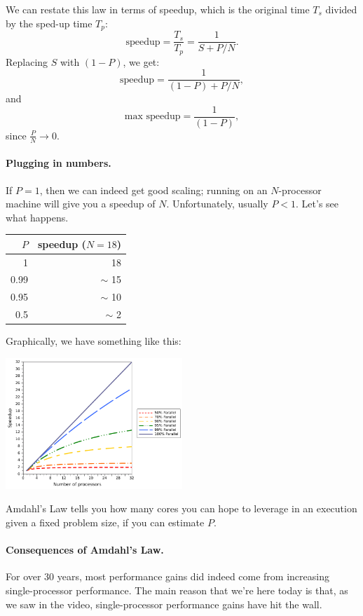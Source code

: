 \documentclass[11pt]{article}
\begin{document}
We can restate this law in terms of speedup, which is the 
original time $T_s$ divided by the sped-up time $T_p$:
\[ \mbox{speedup} = \frac{T_s}{T_p} = \frac{1}{S+P/N}. \]
Replacing $S$ with $(1-P)$, we get:
\[ \mbox{speedup} = \frac{1}{(1-P)+P/N}, \]
and
\[ \mbox{max speedup} = \frac{1}{(1-P)}, \]
since $\frac{P}{N} \rightarrow 0$.

\paragraph{Plugging in numbers.} If $P = 1$, then we can indeed get good
scaling; running on an $N$-processor machine will give you a speedup
of $N$. Unfortunately, usually $P < 1$.  Let's see what happens.

\begin{center}
\begin{tabular}{r|r}
$P$ & speedup ($N=18$) \\ \hline
1 & 18 \\
0.99 & $\sim$ 15 \\
0.95 & $\sim$ 10 \\
0.5 & $\sim$ 2
\end{tabular}
\end{center}
Graphically, we have something like this:
\begin{center}
  \includegraphics[width=0.5\textwidth]{L02/parallel-scaling}
\end{center}


Amdahl's Law tells you how many cores you can hope to leverage in an
execution given a fixed problem size, if you can estimate $P$.

\paragraph{Consequences of Amdahl's Law.}
For over 30 years, most performance gains did indeed come from
increasing single-processor performance. The main reason that we're
here today is that, as we saw in the video,
single-processor performance gains have hit the wall.
\end{document}
